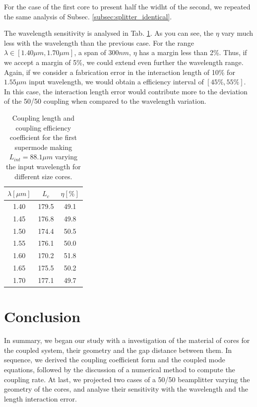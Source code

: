 \documentclass[conference, a4paper]{IEEEtran}
\begin{document}
For the case of the first core to present half the widht of the second, we repeated the same analysis of Subsec. \ref{subsec:splitter_identical}. 


The wavelength sensitivity is analysed in Tab. \ref{tab:splitter_doubled_lc}. As you can see, the $\eta$ vary much less with the wavelength than the previous case. For the range $\lambda \in [1.40 \mu m, 1.70 \mu m]$, a span of $300nm$, $\eta$ has a margin less than 2\%. Thus, if we accept a margin of 5\%, we could extend even further the wavelength range. Again, if we consider a fabrication error in the interaction length of 10\% for $1.55\mu m$ input wavelength, we would obtain a efficiency interval of $[45\%, 55\%]$. In this case, the interaction length error would contribute more to the deviation of the 50/50 coupling when compared to the wavelength variation.

\begin{table}[H]
    \centering
    \begin{tabular}{ccc}
        \toprule
        $\lambda [\mu m]$ & $L_c$ & $\eta[\%]$ \\
        \midrule
        1.40 & 179.5 & 49.1 \\
        1.45 & 176.8 & 49.8 \\
        1.50 & 174.4 & 50.5 \\
        1.55 & 176.1 & 50.0 \\
        1.60 & 170.2 & 51.8 \\
        1.65 & 175.5 & 50.2 \\
        1.70 & 177.1 & 49.7 \\    
        \bottomrule
    \end{tabular}
    \caption{Coupling length and coupling efficiency coefficient for the first supermode making $L_{int} = 88.1\mu m$ varying the input wavelength for different size cores.}
    \label{tab:splitter_doubled_lc}
\end{table}

\section{Conclusion}
\label{sec:conclusion}

In summary, we began our study with a investigation of the material of cores for the coupled system, their geometry and the gap distance between them. In sequence, we derived the coupling coefficient form and the coupled mode equations, followed by the discussion of a numerical method to compute the coupling rate. At last, we projected two cases of a 50/50 beamplitter varying the geometry of the cores, and analyse their sensitivity with the wavelength and the length interaction error.

% 
% 

\end{document}

